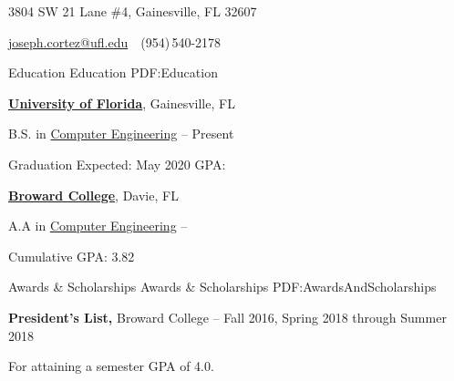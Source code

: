 \documentclass[letterpaper,MMMyyyy,nonstopmode]{simpleresumecv}
\newcommand{\CVAuthor}{Joseph Cortez}
\newcommand{\CVWebpage}{http://www.josephcortez.me/}
\begin{document}

\Title{\CVAuthor}

\begin{SubTitle}
{3804 SW 21 Lane \#4, Gainesville, FL 32607}
\par
\href{mailto:joseph.cortez@ufl.edu}
{joseph.cortez@ufl.edu}
\,\SubBulletSymbol\,
(954)\,540-2178\,
\end{SubTitle}

\begin{Body}


\Section
{Education}
{Education}
{PDF:Education}

\Entry
\href{http://www.example.com/my-university}
{\textbf{University of Florida}},
Gainesville, FL

\Gap
\BulletItem
B.S. in
\href{http://www.example.com/my-department}
{Computer Engineering}
\hfill
{} --
Present
\begin{Detail}
\SubBulletItem
Graduation Expected: May 2020
\SubBulletItem
GPA: 
\end{Detail}

\BigGap
\Entry
\href{http://www.example.com/my-college}
{\textbf{Broward College}},
Davie, FL

\Gap
\BulletItem
A.A in
\href{http://www.example.com/my-department}
{Computer Engineering}
\hfill
{} --
\begin{Detail}
\SubBulletItem
Cumulative GPA: 3.82
\end{Detail}


\Section
{Awards \&\newline
Scholarships}
{Awards \& Scholarships}
{PDF:AwardsAndScholarships}

\Entry
\textbf{President's List,}
Broward College
\hfill
{} --
\BulletItem
Fall 2016, Spring 2018 through Summer 2018

\begin{Detail}
\SubBulletItem
For attaining a semester GPA of 4.0.
\end{Detail}



\end{Body}
\end{document}
